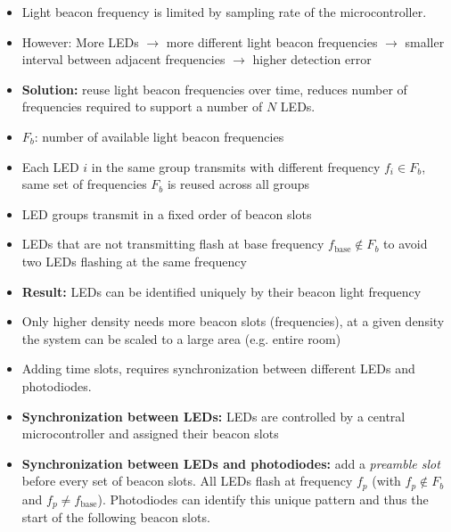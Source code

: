 \documentclass[12pt]{article}
\begin{document}
\begin{itemize}
    \setlength\itemsep{1em}
    \vspace{0.5cm}
    
    \item Light beacon frequency is limited by sampling rate of the microcontroller.
    
    \item However: More LEDs $\rightarrow$ more different light beacon frequencies $\rightarrow$ smaller interval between adjacent frequencies $\rightarrow$ higher detection error
    
    \item \textbf{Solution:} reuse light beacon frequencies over time, reduces number of frequencies required to support a number of $N$ LEDs.
    
    \item $F_b$: number of available light beacon frequencies
    
    \item Each LED $i$ in the same group transmits with different frequency $f_i \in F_b$, same set of frequencies $F_b$ is reused across all groups
    
    \item LED groups transmit in a fixed order of beacon slots
    
    \item LEDs that are not transmitting flash at base frequency $f_{\text{base}} \notin F_b$ to avoid two LEDs flashing at the same frequency
    
    \item \textbf{Result:} LEDs can be identified uniquely by their beacon light frequency
    
    \item Only higher density needs more beacon slots (frequencies), at a given density the system can be scaled to a large area (e.g. entire room)
    
    \item Adding time slots, requires synchronization between different LEDs and photodiodes. 
    
    \item \textbf{Synchronization between LEDs:} LEDs are controlled by a central microcontroller and assigned their beacon slots
    
    \item \textbf{Synchronization between LEDs and photodiodes:} add a \emph{preamble slot} before every set of beacon slots. All LEDs flash at frequency $f_p$ (with $f_p \notin F_b$ and $f_p \neq f_{\text{base}}$). Photodiodes can identify this unique pattern and thus the start of the following beacon slots.
    

\end{itemize}
\end{document}
